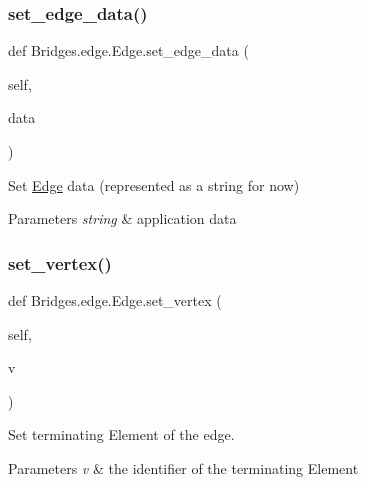 \subsubsection{\texorpdfstring{set\+\_\+edge\+\_\+data()}{set\_edge\_data()}}
{\footnotesize\ttfamily def Bridges.\+edge.\+Edge.\+set\+\_\+edge\+\_\+data (\begin{DoxyParamCaption}\item[{}]{self,  }\item[{}]{data }\end{DoxyParamCaption})}



Set \mbox{\hyperlink{class_bridges_1_1edge_1_1_edge}{Edge}} data (represented as a string for now) 


\begin{DoxyParams}{Parameters}
{\em string} & application data \\
\hline
\end{DoxyParams}
\mbox{\label{class_bridges_1_1edge_1_1_edge_a8d8d9c805341d0d6dd45210d740d7de1}} 
\subsubsection{\texorpdfstring{set\+\_\+vertex()}{set\_vertex()}}
{\footnotesize\ttfamily def Bridges.\+edge.\+Edge.\+set\+\_\+vertex (\begin{DoxyParamCaption}\item[{}]{self,  }\item[{}]{v }\end{DoxyParamCaption})}



Set terminating Element of the edge. 


\begin{DoxyParams}{Parameters}
{\em v} & the identifier of the terminating Element \\
\hline
\end{DoxyParams}
\mbox{\label{class_bridges_1_1edge_1_1_edge_a6e6cd15ddf1a1550edbdcc947b8bf52c}} 
